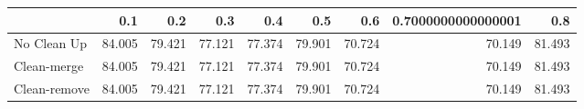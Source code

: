 \begin{tabular}{lrrrrrrrr}
\toprule
{} &    0.1 &    0.2 &    0.3 &    0.4 &    0.5 &    0.6 & 0.7000000000000001 &    0.8 \\
\midrule
No Clean Up  & 84.005 & 79.421 & 77.121 & 77.374 & 79.901 & 70.724 &             70.149 & 81.493 \\
Clean-merge  & 84.005 & 79.421 & 77.121 & 77.374 & 79.901 & 70.724 &             70.149 & 81.493 \\
Clean-remove & 84.005 & 79.421 & 77.121 & 77.374 & 79.901 & 70.724 &             70.149 & 81.493 \\
\bottomrule
\end{tabular}
